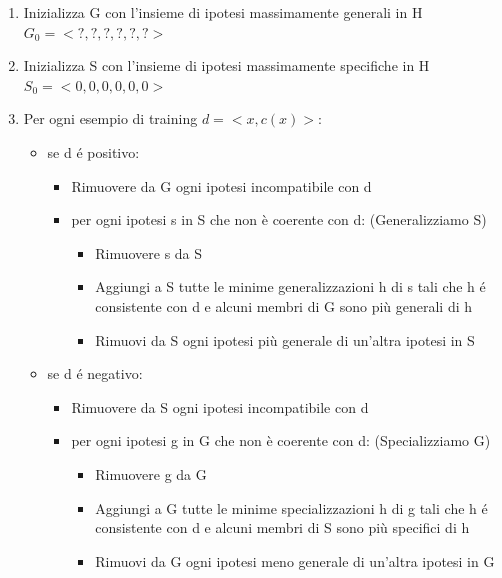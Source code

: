 \documentclass{article}
\begin{document}
\begin{enumerate}
    \item Inizializza G con l'insieme di ipotesi massimamente generali in H $G_0 = <?, ?, ?, ?, ?, ?>$
    \item Inizializza S con l'insieme di ipotesi massimamente specifiche in H $S_0 = <0, 0, 0, 0, 0, 0>$
    \item Per ogni esempio di training $d=<x,c(x)>$:
        \begin{itemize}
            \item se d é positivo: 
                \begin{itemize}
                    \item Rimuovere da G ogni ipotesi incompatibile con d
                    \item per ogni ipotesi s in S che non è coerente con d: (Generalizziamo S)
                        \begin{itemize}
                        \item Rimuovere s da S
                        \item Aggiungi a S tutte le minime generalizzazioni h di s tali che h é consistente con d e alcuni membri di G sono più generali di h
                        \item Rimuovi da S ogni ipotesi più generale di un'altra ipotesi in S
                        \end{itemize}
                \end{itemize}
            \item se d é negativo: 
                \begin{itemize}
                    \item Rimuovere da S ogni ipotesi incompatibile con d
                    \item per ogni ipotesi g in G che non è coerente con d: (Specializziamo G)
                        \begin{itemize}
                        \item Rimuovere g da G
                        \item Aggiungi a G tutte le minime specializzazioni h di g tali che h é consistente con d e alcuni membri di S sono più specifici di h
                        \item Rimuovi da G ogni ipotesi meno generale di un'altra ipotesi in G
                        \end{itemize}
                \end{itemize}
        \end{itemize}
\end{enumerate}
\end{document}
